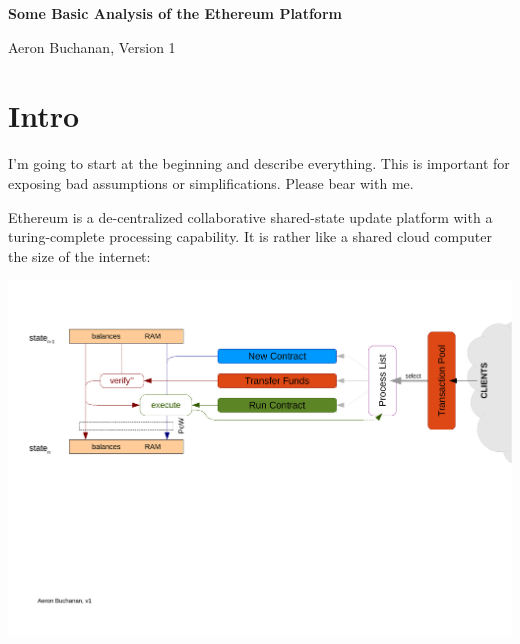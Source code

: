 \documentclass[10pt,a4paper]{article}
\begin{document}
\newcommand{\ether}{Ether\xspace}
\newcommand{\ie}{{i.e.}\xspace}
\newcommand{\eg}{{e.g.}\xspace}

\newcommand{\parameterize}[1]{{\ensuremath{#1}}\xspace}
\newcommand{\R}{\parameterize{R}}
\newcommand{\N}{\parameterize{N}}
\newcommand{\T}{\parameterize{T}}
\newcommand{\x}{\parameterize{\mathbf x}}
\newcommand{\udd}{\parameterize{\ddot{u}}}
\newcommand{\U}{\parameterize{\ddot{U}}}
\newcommand{\NC}{\parameterize{N^C}}

\renewcommand{\labelitemi}{$\cdot$}

\begin{center}
{\LARGE\bf Some Basic Analysis of the Ethereum Platform}

Aeron Buchanan, Version 1
\end{center} 

\vspace*{-.6cm}
\section*{Intro}

I'm going to start at the beginning and describe everything. This is important for exposing bad assumptions or simplifications. Please bear with me.

Ethereum is a de-centralized collaborative shared-state update platform with a turing-complete processing capability. It is rather like a shared cloud computer the size of the internet:

\begin{center}
\includegraphics[trim=0cm 10cm 0cm 2cm, clip, width=15cm]{FlowDiagramEthereumOnly.pdf}
\end{center}
\end{document}
